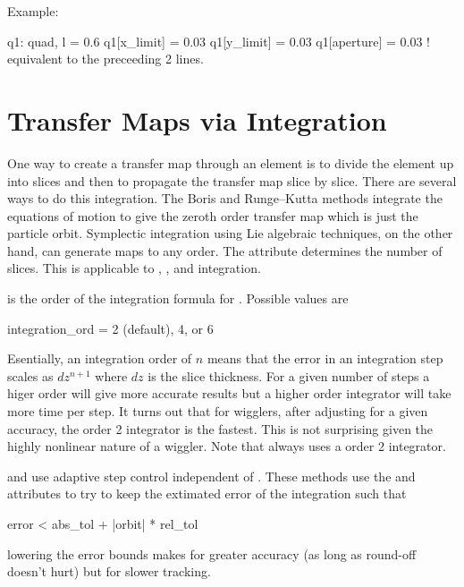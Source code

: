 \noindent
Example:
\begin{example}
  q1: quad, l = 0.6
  q1[x_limit] = 0.03
  q1[y_limit] = 0.03
  q1[aperture] = 0.03  ! equivalent to the preceeding 2 lines.  
\end{example}

\section{Transfer Maps via Integration}
\label{s:integ}

One way to create a transfer map through an element is to divide the
element up into slices and then to propagate the transfer
map slice by slice.
There are several ways to do this integration. The Boris and Runge--Kutta 
methods integrate the equations of motion to give the zeroth order
transfer map which is just the particle orbit.
Symplectic integration using Lie algebraic techniques, on the other hand, 
can generate maps to any order.
The  attribute determines the number of slices. This is
applicable to , , and 
integration. 

 is the order of the integration formula for 
. Possible values are
\begin{example}
  integration\_ord = 2 (default), 4, or 6
\end{example}
Esentially, an integration order of $n$ means that the error in an 
integration step scales as $dz^{n+1}$ where $dz$ is the slice thickness.
For a given number of steps a higer order will give more accurate results
but a higher order integrator will take more time per step. It turns out
that for wigglers, after adjusting  for a given accuracy, 
the order 2 integrator is the fastest. This is not surprising given the
highly nonlinear nature of a wiggler. Note that  always
uses a order 2 integrator.

 and  use adaptive step
control independent of . These methods use the  and
 attributes to try to keep the extimated error of the integration
such that
\begin{example}
  error < abs\_tol + |orbit| * rel_tol
\end{example}
lowering the error bounds makes for greater accuracy (as long as round-off 
doesn't hurt) but for slower tracking. 

